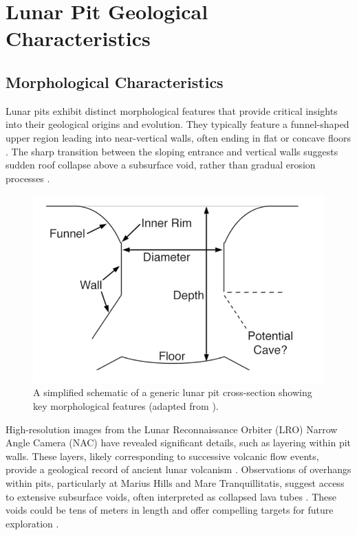 \graphicspath{{img/ch2}}

\section{Lunar Pit Geological Characteristics}

\subsection{Morphological Characteristics}

Lunar pits exhibit distinct morphological features that provide critical insights into their geological origins and evolution. They typically feature a funnel-shaped upper region leading into near-vertical walls, often ending in flat or concave floors \cite{new-wagner}. The sharp transition between the sloping entrance and vertical walls suggests sudden roof collapse above a subsurface void, rather than gradual erosion processes \cite{lunar-pits-numerical-modelling, lunar-pits-entrances-to-caves}.

\begin{figure}[h!]
    \centering
    \includegraphics[width=0.5\linewidth]{lunar_pit_schema.png}
    \caption{A simplified schematic of a generic lunar pit cross-section showing key morphological features (adapted from \cite{new-wagner}).}
    \label{fig:lunar-pit-schema}
\end{figure}

High-resolution images from the Lunar Reconnaissance Orbiter (LRO) Narrow Angle Camera (NAC) have revealed significant details, such as layering within pit walls. These layers, likely corresponding to successive volcanic flow events, provide a geological record of ancient lunar volcanism \cite{new-wagner}. Observations of overhangs within pits, particularly at Marius Hills and Mare Tranquillitatis, suggest access to extensive subsurface voids, often interpreted as collapsed lava tubes \cite{lunar-pits-entrances-to-caves, Carrer2024}. These voids could be tens of meters in length and offer compelling targets for future exploration \cite{lava-tube-observations}.

